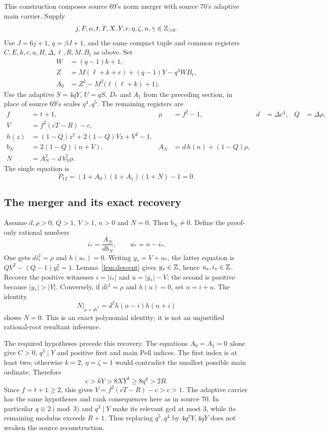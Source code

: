This construction composes source 69's norm merger with source 70's
adaptive main carrier. Supply
\[
 j,F,\alpha,t,T,X,Y,r,\eta,\zeta,n,\gamma\in\mathbb Z_{>0}.
\]
Use $J=6j+1$, $q=\beta J+1$, and the same compact tuple and common
registers $C,E,k,c,a,H,\Delta,\ell,R,M,B_t$ as above. Set
\begin{align*}
 W&=(q-1)k+1,\\
 Z&=M(\ell+k+r)+(q-1)Y-q^3WB_t,\\
 A_0&=Z^2-M^2\bigl(\ell(\ell+k)+1\bigr).
\end{align*}
Use the adaptive $S=4qY$, $U=qS$, $D_*$ and $A_1$ from the preceding
section, in place of source 69's scales $q^4,q^5$.
The remaining registers are
\begin{align*}
 f&=t+1,&\rho&=f^2-1,&d&=\Delta c^4,&Q&=\Delta\rho,\\
 V&=f^2(cT-R)-c,\\
 h(z)&=(1-Q)z^2+2(1-Q)Vz+V^2-1,\\
 b_N&=2(1-Q)(n+V),&A_N&=d\,h(n)+(1-Q)\rho,\\
 N&=A_N^2-d\,b_N^2\rho.
\end{align*}
The single equation is
\begin{equation}
 \boxed{P_{12}=(1+A_0)(1+A_1)(1+N)-1=0.}
 \label{eq:P12}
\end{equation}

\subsection{The merger and its exact recovery}

Assume $d,\rho>0$, $Q>1$, $V>1$, $n>0$ and $N=0$.
Then $b_N\ne0$. Define the proof-only rational numbers
\[
 i_*=\frac{A_N}{d b_N},\qquad u_*=n-i_*.
\]
One gets $d i_*^2=\rho$ and $h(u_*)=0$. Writing $y_*=V+u_*$,
the latter equation is $QV^2-(Q-1)y_*^2=1$.
Lemma~\ref{lem:descent} gives $y_*\in\mathbb Z$, hence $u_*,i_*\in\mathbb Z$.
Recover the positive witnesses $i=|i_*|$ and $u=|y_*|-V$;
the second is positive because $|y_*|>|V|$.
Conversely, if $d i^2=\rho$ and $h(u)=0$, set $n=i+u$. The identity
\[
 N\big|_{\rho=di^2}=d^2h(n-i)h(n+i)
\]
shows $N=0$. This is an exact polynomial identity; it is not an
unjustified rational-root resultant inference.

The required hypotheses precede this recovery. The equations $A_0=A_1=0$
alone give $C>0$, $q^3\mid Y$ and positive first and main Pell indices.
The first index is at least two; otherwise $k=2$, $\eta=\zeta=1$
would contradict the smallest possible main ordinate. Therefore
\[
 c>kY>8XY^3\ge8q^9>2R.
\]
Since $f=t+1\ge2$, this gives
$V=f^2(cT-R)-c>c>1$. The adaptive carrier has the same hypotheses and
rank consequences here as in source 70. In particular $q\equiv2\pmod3$
and $q^3\mid Y$ make its relevant gcd at most $3$, while its remaining
modulus exceeds $R+1$. Thus replacing $q^5,q^4$ by $4q^2Y,4qY$
does not weaken the source reconstruction.

